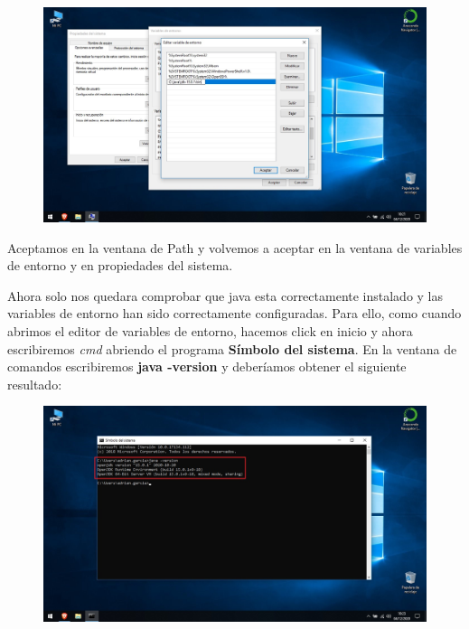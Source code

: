 \documentclass[a4paper,10pt]{article}
\begin{document}
\begin{figure}[H]
\begin{center}
\includegraphics[width=500pt]{./fotos/introduccion/14 - Java.jpg}
\end{center}
\end{figure}

Aceptamos en la ventana de Path y volvemos a aceptar en la ventana de variables de entorno y en propiedades del sistema.

\clearpage

Ahora solo nos quedara comprobar que java esta correctamente instalado y las variables de entorno han sido correctamente configuradas. Para ello, como cuando abrimos el editor de variables de entorno, hacemos click en inicio y ahora escribiremos \textit{cmd} abriendo el programa \textbf{Símbolo del sistema}. En la ventana de comandos escribiremos \textbf{java -version} y deberíamos obtener el siguiente resultado:

\begin{figure}[H]
\begin{center}
\includegraphics[width=500pt]{./fotos/introduccion/15 - Java (V).jpg}
\end{center}
\end{figure}
\end{document}

